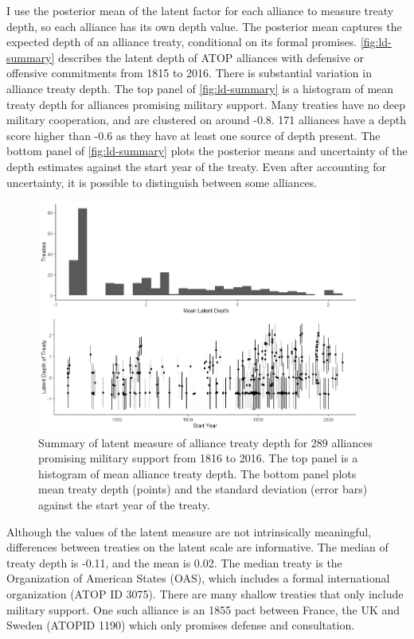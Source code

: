 \documentclass[12pt]{article}
\begin{document}
I use the posterior mean of the latent factor for each alliance to measure treaty depth, so each alliance has its own depth value.
The posterior mean captures the expected depth of an alliance treaty, conditional on its formal promises. 
\autoref{fig:ld-summary} describes the latent depth of ATOP alliances with defensive or offensive commitments from 1815 to 2016.
There is substantial variation in alliance treaty depth. 
The top panel of \autoref{fig:ld-summary} is a histogram of mean treaty depth for alliances promising military support.  
Many treaties have no deep military cooperation, and are clustered on around -0.8.  
171 alliances have a depth score higher than -0.6 as they have at least one source of depth present. 
The bottom panel of \autoref{fig:ld-summary} plots the posterior means and uncertainty of the depth estimates against the start year of the treaty. 
Even after accounting for uncertainty, it is possible to distinguish between some alliances. 


\begin{figure}
	\centering
		\includegraphics[width=0.95\textwidth]{../figures/ld-summary.png}
	\caption{Summary of latent measure of alliance treaty depth for 289 alliances promising military support from 1816 to 2016. The top panel is a histogram of mean alliance treaty depth. The bottom panel plots mean treaty depth (points) and the standard deviation (error bars) against the start year of the treaty.}
	\label{fig:ld-summary}
\end{figure}


Although the values of the latent measure are not intrinsically meaningful, differences between treaties on the latent scale are informative. 
The median of treaty depth is -0.11, and the mean is 0.02. 
The median treaty is the Organization of American States (OAS), which includes a formal international organization (ATOP ID 3075). 
There are many shallow treaties that only include military support. 
One such alliance is an 1855 pact between France, the UK and Sweden (ATOPID 1190) which only promises defense and consultation. 
\end{document}
